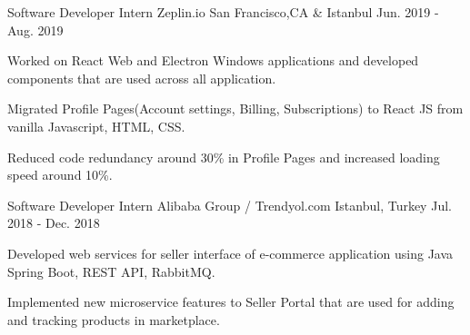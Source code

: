 \begin{cventries}
  \cvopenentry
   {Software Developer Intern} %
    {Zeplin.io} %
    {San Francisco,CA \& Istanbul} %
    {Jun. 2019 - Aug. 2019} %
    {
      \begin{cvitems} %
        \item {Worked on React Web and Electron Windows applications and developed components that are used across all application.}
		\item {Migrated Profile Pages(Account settings, Billing, Subscriptions) to React JS from vanilla Javascript, HTML, CSS.}
        \item {Reduced code redundancy around 30\% in Profile Pages and increased loading speed around 10\%. }
      \end{cvitems}
    }
  \cvopenentry
   {Software Developer Intern} %
    {Alibaba Group / Trendyol.com} %
    {Istanbul, Turkey} %
    {Jul. 2018 - Dec. 2018} %
    {
      \begin{cvitems} %
		 \item {Developed web services for seller interface of e-commerce application using Java Spring Boot, REST API, RabbitMQ.}
        \item {Implemented new microservice features to Seller Portal that are used for adding and tracking products in marketplace.}
      \end{cvitems}
    }



\end{cventries}
